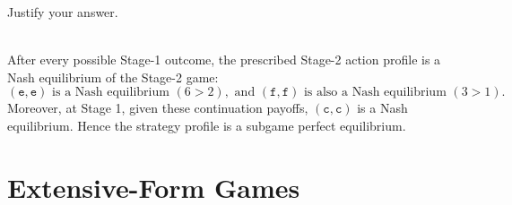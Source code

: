 \begin{enumerate}
Justify your answer.
\\~\\
\choicecorrect[Yes]\choice[No]
\begin{solution}
After every possible Stage-1 outcome, the prescribed Stage-2 action profile is a Nash equilibrium of the Stage-2 game:
\[
(\texttt{e},\texttt{e}) \text{ is a Nash equilibrium } (6>2), \text{ and } (\texttt{f},\texttt{f}) \text{ is also a Nash equilibrium } (3>1).
\]
Moreover, at Stage 1, given these continuation payoffs, $(\texttt{c},\texttt{c})$ is a Nash equilibrium. Hence the strategy profile is a subgame perfect equilibrium.
\end{solution}
\vspace{80pt}
\end{enumerate}
\clearpage
\section{\points[18] Extensive-Form Games}
